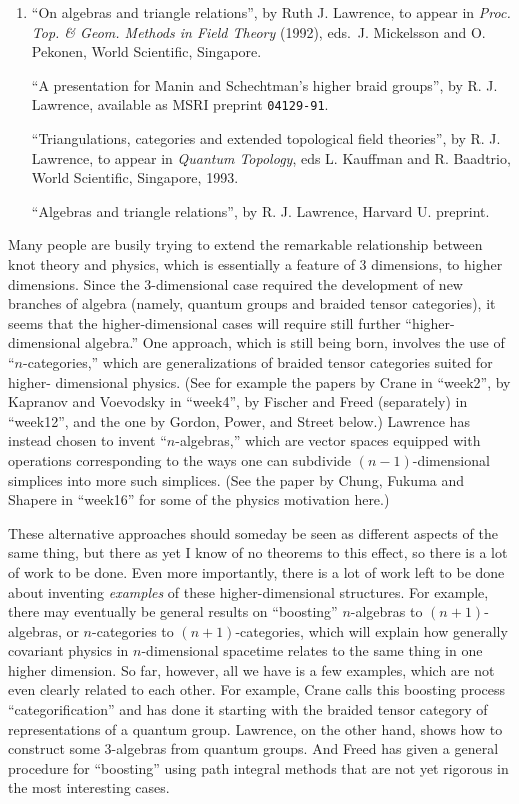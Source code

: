 \documentclass{article}
\begin{document}
\begin{enumerate}
\def\labelenumi{\arabic{enumi})}
\item
  ``On algebras and triangle relations'', by Ruth J. Lawrence, to appear
  in \emph{Proc. Top. \& Geom. Methods in Field Theory} (1992), eds.~J.
  Mickelsson and O. Pekonen, World Scientific, Singapore.

  ``A presentation for Manin and Schechtman's higher braid groups'', by
  R. J. Lawrence, available as MSRI preprint \texttt{04129-91}.

  ``Triangulations, categories and extended topological field
  theories'', by R. J. Lawrence, to appear in \emph{Quantum Topology},
  eds L. Kauffman and R. Baadtrio, World Scientific, Singapore, 1993.

  ``Algebras and triangle relations'', by R. J. Lawrence, Harvard U.
  preprint.
\end{enumerate}

Many people are busily trying to extend the remarkable relationship
between knot theory and physics, which is essentially a feature of 3
dimensions, to higher dimensions. Since the 3-dimensional case required
the development of new branches of algebra (namely, quantum groups and
braided tensor categories), it seems that the higher-dimensional cases
will require still further ``higher-dimensional algebra.'' One approach,
which is still being born, involves the use of ``\(n\)-categories,''
which are generalizations of braided tensor categories suited for
higher- dimensional physics. (See for example the papers by Crane in
``week2'', by Kapranov and Voevodsky in ``week4'', by Fischer and Freed
(separately) in ``week12'', and the one by Gordon, Power, and Street
below.) Lawrence has instead chosen to invent ``\(n\)-algebras,'' which
are vector spaces equipped with operations corresponding to the ways one
can subdivide \((n-1)\)-dimensional simplices into more such simplices.
(See the paper by Chung, Fukuma and Shapere in ``week16'' for some of
the physics motivation here.)

These alternative approaches should someday be seen as different aspects
of the same thing, but there as yet I know of no theorems to this
effect, so there is a lot of work to be done. Even more importantly,
there is a lot of work left to be done about inventing \emph{examples}
of these higher-dimensional structures. For example, there may
eventually be general results on ``boosting'' \(n\)-algebras to
\((n+1)\)-algebras, or \(n\)-categories to \((n+1)\)-categories, which
will explain how generally covariant physics in \(n\)-dimensional
spacetime relates to the same thing in one higher dimension. So far,
however, all we have is a few examples, which are not even clearly
related to each other. For example, Crane calls this boosting process
``categorification'' and has done it starting with the braided tensor
category of representations of a quantum group. Lawrence, on the other
hand, shows how to construct some 3-algebras from quantum groups. And
Freed has given a general procedure for ``boosting'' using path integral
methods that are not yet rigorous in the most interesting cases.
\end{document}
